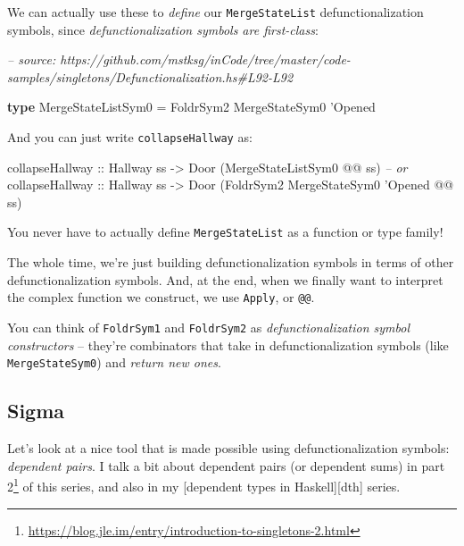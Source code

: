 \documentclass[]{article}
\newenvironment{Shaded}{}{}
\newcommand{\CommentTok}[1]{\textcolor[rgb]{0.38,0.63,0.69}{\textit{#1}}}
\newcommand{\DataTypeTok}[1]{\textcolor[rgb]{0.56,0.13,0.00}{#1}}
\newcommand{\FunctionTok}[1]{\textcolor[rgb]{0.02,0.16,0.49}{#1}}
\newcommand{\KeywordTok}[1]{\textcolor[rgb]{0.00,0.44,0.13}{\textbf{#1}}}
\newcommand{\NormalTok}[1]{#1}
\newcommand{\OtherTok}[1]{\textcolor[rgb]{0.00,0.44,0.13}{#1}}
\renewcommand{\href}[2]{#2\footnote{\url{#1}}}
\begin{document}
We can actually use these to \emph{define} our \texttt{MergeStateList}
defunctionalization symbols, since \emph{defunctionalization symbols are
first-class}:

\begin{Shaded}
\begin{Highlighting}[]
\CommentTok{-- source: https://github.com/mstksg/inCode/tree/master/code-samples/singletons/Defunctionalization.hs#L92-L92}

\KeywordTok{type} \DataTypeTok{MergeStateListSym0} \FunctionTok{=} \DataTypeTok{FoldrSym2} \DataTypeTok{MergeStateSym0}\NormalTok{ '}\DataTypeTok{Opened}
\end{Highlighting}
\end{Shaded}

And you can just write \texttt{collapseHallway} as:

\begin{Shaded}
\begin{Highlighting}[]
\OtherTok{collapseHallway ::} \DataTypeTok{Hallway}\NormalTok{ ss }\OtherTok{->} \DataTypeTok{Door}\NormalTok{ (}\DataTypeTok{MergeStateListSym0} \FunctionTok{@@}\NormalTok{ ss)}
\CommentTok{-- or}
\OtherTok{collapseHallway ::} \DataTypeTok{Hallway}\NormalTok{ ss }\OtherTok{->} \DataTypeTok{Door}\NormalTok{ (}\DataTypeTok{FoldrSym2} \DataTypeTok{MergeStateSym0}\NormalTok{ '}\DataTypeTok{Opened} \FunctionTok{@@}\NormalTok{ ss)}
\end{Highlighting}
\end{Shaded}

You never have to actually define \texttt{MergeStateList} as a function or type
family!

The whole time, we're just building defunctionalization symbols in terms of
other defunctionalization symbols. And, at the end, when we finally want to
interpret the complex function we construct, we use \texttt{Apply}, or
\texttt{@@}.

You can think of \texttt{FoldrSym1} and \texttt{FoldrSym2} as
\emph{defunctionalization symbol constructors} -- they're combinators that take
in defunctionalization symbols (like \texttt{MergeStateSym0}) and \emph{return
new ones}.

\hypertarget{sigma}{%
\subsection{Sigma}\label{sigma}}

Let's look at a nice tool that is made possible using defunctionalization
symbols: \emph{dependent pairs}. I talk a bit about dependent pairs (or
dependent sums) in
\href{https://blog.jle.im/entry/introduction-to-singletons-2.html}{part 2} of
this series, and also in my {[}dependent types in Haskell{]}{[}dth{]} series.
\end{document}
